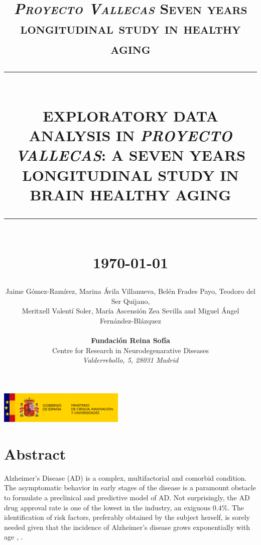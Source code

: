 \documentclass[11pt]{article}
\theoremstyle{definition}
\theoremstyle{remark}
\newcommand{\HRule}[1]{\rule{\linewidth}{#1}}
\begin{document}

\title{ \normalsize \textsc{\emph{Proyecto Vallecas} Seven years longitudinal study in healthy aging}
    \\ [2.0cm]
    \HRule{0.5pt} \\
    \LARGE \textbf{\uppercase{Exploratory Data Analysis in \emph{Proyecto Vallecas}: a seven years longitudinal study in brain healthy aging}}
    \HRule{2pt} \\ [0.5cm]
    \normalsize \today \vspace*{5\baselineskip}}

\date{ }
\author{
    Jaime G\'omez-Ram\'irez, Marina \'Avila Villanueva, Bel\'en Frades Payo, Teodoro del Ser Quijano,\\ Meritxell Valent\'i Soler, María Ascensi\'on Zea Sevilla and Miguel \'Angel Fern\'andez-Bl\'azquez   \\  \\
    \textbf{\large{Fundaci\'on Reina Sof\'ia}} \\
    Centre for Research in Neurodegenarative Diseases
    \\ \emph{Valderrebollo, 5, 28031 Madrid}
 }

\maketitle
\begin{center}
\includegraphics[width = 60mm]{figures/logo_mciu.png}
\end{center}
\newpage
\tableofcontents
\newpage

\sectionfont{\scshape}



\section*{Abstract}
Alzheimer's Disease (AD) is a complex, multifactorial and comorbid condition. The asymptomatic behavior in early stages of the disease is a paramount obstacle to formulate a preclinical and predictive model of AD. Not surprisingly, the AD drug approval rate is one of the lowest in the industry, an exiguous $0.4\%$. The identification of risk factors, preferably obtained by the subject herself, is sorely needed given that the incidence of Alzheimer’s disease grows exponentially with age \cite{ferri2005global}, \cite{ganguli2011age}. 
\end{document}
